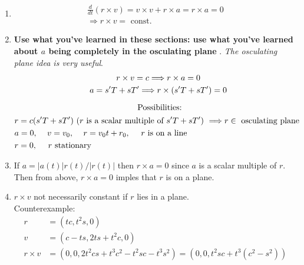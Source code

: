 \documentclass[twoside]{amsart}
\theoremstyle{plain}
\theoremstyle{definition}
\newcommand{\exercisehead}[1]
  {\smallskip
   \noindent{\small\bf Exercise #1.}}
\begin{document}
\exercisehead{10}
\begin{enumerate}
  \item \[
    \begin{gathered}
      \frac{d}{dt} ( r\times v) = v\times v + r\times a = r\times a = 0 \\
      \Longrightarrow r \times v = \text{ const. }
\end{gathered}
\]
\item \textbf{ Use what you've learned in these sections: use what you've learned about $a$ being completely in the osculating plane }.  \emph{ The osculating plane idea is very useful}.  
\[
\begin{gathered}
  r \times v =c \Longrightarrow r \times a = 0  \\
  a = s'T + sT' \Longrightarrow r \times (s' T + sT') = 0 \medskip \\
  \text{ Possibilities:} \\
  \begin{aligned}
    & r = c(s'T + sT') \text{ ($r$ is a scalar multiple of $s'T + sT'$) } \Longrightarrow r \in \text{ osculating plane } \\
    & a = 0, \quad \, v = v_0, \quad \, r = v_0 t + r_0 , \quad \text{ $r$ is on a line } \\
    & r = 0, \quad \text{ $r$ stationary }
  \end{aligned}
\end{gathered}
\]
\item If $a = |a(t)| r(t)/|r(t)|$ then $r\times a =0$ since $a$ is a scalar multiple of $r$.  Then from above, $r\times a=0$ imples that $r$ is on a plane.  
\item $r\times v$ not necessarily constant if $r$ lies in a plane.  \medskip \\
Counterexample: 
\[
\begin{aligned}
  r & = (tc,t^2s,0) \\
  v & = (c -ts, 2ts + t^2 c,0 ) \\
  r\times v & = (0,0, 2t^2 cs + t^3 c^2 - t^2 sc - t^3s^2 ) = (0,0, t^2 sc+ t^3(c^2-s^2) )
\end{aligned}
\]
\end{enumerate}
\end{document}
